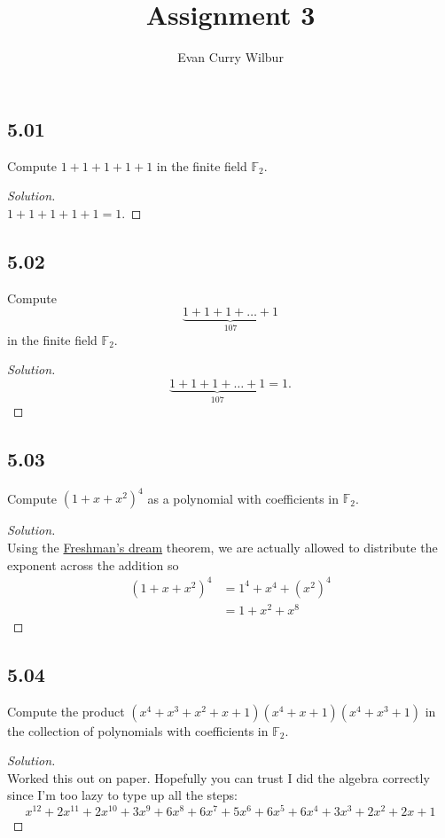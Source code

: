 \documentclass[]{article}
\title{Assignment 3}
\author{Evan Curry Wilbur}
\newcommand\<{\langle}
\renewcommand\>{\rangle}
\newcommand{\FF}{\ensuremath{\mathbb{F}}}
\newenvironment{solution}
{
	\begin{proof}[Solution] \text{ }
		\\
	}
	{
	\end{proof}
}
\begin{document}
\maketitle

\subsection*{5.01} Compute $1 + 1 + 1 + 1 + 1$ in the finite field $\FF_2$.
\begin{solution}
	$1 + 1 + 1 + 1 + 1 = 1$.
\end{solution}

\subsection*{5.02} Compute
$$
	\underbrace{1 + 1 + 1 + \dots + 1}_\text{107}
$$
in the finite field $\FF_2$.
\begin{solution}
	$$
		\underbrace{1 + 1 + 1 + \dots + 1}_\text{107} = 1.
	$$
\end{solution}

\subsection*{5.03} Compute $\left(1 + x + x^2\right)^4$ as a polynomial with coefficients in $\FF_2$.
\begin{solution}
	Using the \href{https://planetmath.org/freshmansdream}{Freshman's dream} theorem, we are actually allowed to distribute the exponent across the addition so
\begin{align*}
	\left(1 + x + x^2\right)^4 &= 1^4 + x^4 + \left(x^2\right)^4 \\
	&= 1 + x^2 + x^8 
\end{align*}
\end{solution}

\subsection*{5.04} Compute the product $\left(x^4 + x^3 + x^2 + x + 1\right)\left(x^4 + x + 1\right)\left(x^4 + x^3 + 1\right)$ in the collection of polynomials with coefficients in $\FF_2$.
\begin{solution}
	Worked this out on paper. Hopefully you can trust I did the algebra correctly since I'm too lazy to type up all the steps:
	$$
		x^{12}+2x^{11}+2x^{10}+3x^9+6x^8+6x^7+5x^6+6x^5+6x^4+3x^3+2x^2+2x+1
	$$
\end{solution}
\end{document}
